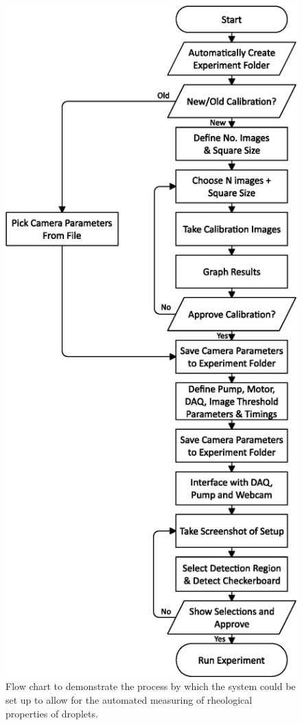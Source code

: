 \documentclass{physics_article_B}
\begin{document}
        \newpage
        \begin{figure}[H]
            \centering
            \hspace*{-5.4cm}\includegraphics[scale=0.8]{Figures/FlowSetup.eps}
            \caption{Flow chart to demonstrate the process by which the system could be set up to allow for the automated measuring of rheological properties of droplets.}
            \label{fig:setup:flow}
        \end{figure}
        
\end{document}
